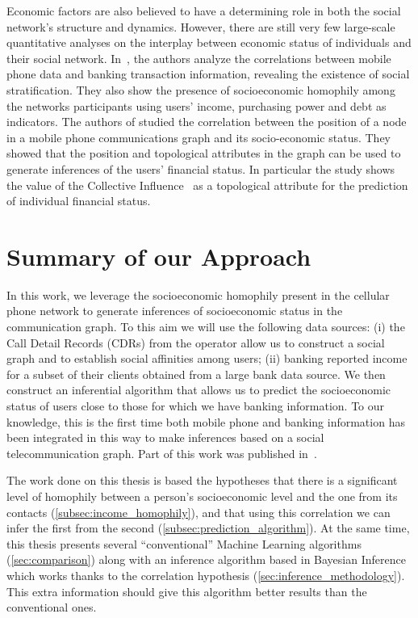 Economic factors are also believed to have a determining role in both the social network's structure and dynamics. However, there are still very few large-scale quantitative analyses on the interplay between economic status of individuals and their social network. In~\cite{leo2015socioeconomic}, the authors analyze the correlations between mobile phone data and banking transaction information, revealing the existence of social stratification. They also show the presence of socioeconomic homophily among the networks participants using users' income, purchasing power and debt as indicators.
The authors of \cite{Luo2017inferring} studied the correlation between the position of a node in a mobile phone communications graph and its socio-economic status. They showed that the position and topological attributes in the graph can be used to generate inferences of the users' financial status.
In particular the study \cite{Luo2017inferring} shows the value of the Collective Influence~\cite{morone2015influence} as a topological attribute for the prediction of individual financial status.


\section{Summary of our Approach}

In this work, we leverage the socioeconomic homophily present in the cellular phone network to generate inferences of socioeconomic status in the communication graph. To this aim we will use the following data sources: (i) the Call Detail Records (CDRs) from the operator allow us to construct a social graph and to establish social affinities among users; (ii) banking reported income for a subset of their clients obtained from a large bank data source. We then construct an inferential algorithm that allows us to predict the socioeconomic status of users close to those for which we have banking information. To our knowledge, this is the first time both mobile phone and banking information has been integrated in this way to make inferences based on a social telecommunication graph.
Part of this work was published in~\cite{fixman2016bayesian}.

The work done on this thesis is based the hypotheses that there is a significant level of homophily between a person's socioeconomic level and the one from its contacts (\cref{subsec:income_homophily}), and that using this correlation we can infer the first from the second (\cref{subsec:prediction_algorithm}).
At the same time, this thesis presents several ``conventional'' Machine Learning algorithms (\cref{sec:comparison}) along with an inference algorithm based in Bayesian Inference which works thanks to the correlation hypothesis (\cref{sec:inference_methodology}). This extra information should give this algorithm better results than the conventional ones.

